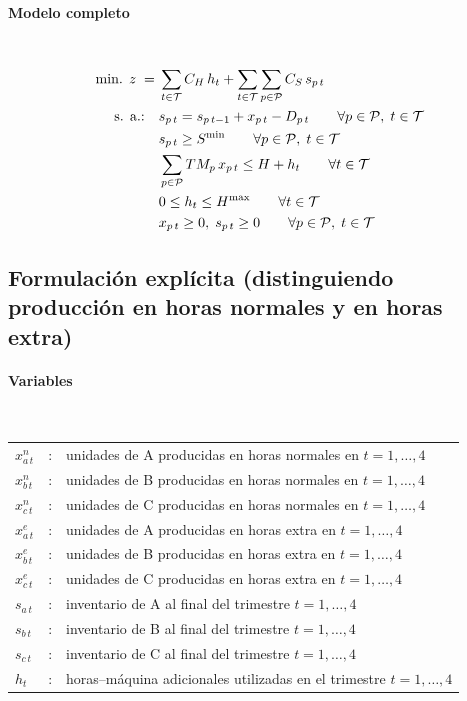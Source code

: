 \paragraph{Modelo completo}\mbox{}\\
\begin{align}
\mbox{min. } z \;=\;& \sum_{t \in \mathcal{T}} C_H\,h_t + \sum_{t \in \mathcal{T}} \sum_{p \in \mathcal{P}} C_S\,s_{p\,t} \notag\\
\mbox{s. a.:}\quad
& s_{p\,t} = s_{p\,t-1} + x_{p\,t} - D_{p\,t} \qquad \forall p \in \mathcal{P},\; t \in \mathcal{T} \notag\\
& s_{p\,t} \ge S^{\min} \qquad \forall p \in \mathcal{P},\; t \in \mathcal{T} \notag\\
& \sum_{p \in \mathcal{P}} TM_p\,x_{p\,t} \le H + h_t \qquad \forall t \in \mathcal{T} \notag\\
& 0 \le h_t \le H^{\max} \qquad \forall t \in \mathcal{T} \notag\\
& x_{p\,t} \ge 0,\; s_{p\,t} \ge 0 \qquad \forall p \in \mathcal{P},\; t \in \mathcal{T} \notag
\end{align}


\subsection{Formulación explícita (distinguiendo producción en horas normales y en horas extra)}

\paragraph{Variables}\mbox{}\\
\begin{tabular}{l c l}
    $x^{n}_{a\,t}$ & : & unidades de A producidas en horas normales en $t=1,\dots,4$\\
    $x^{n}_{b\,t}$ & : & unidades de B producidas en horas normales en $t=1,\dots,4$\\
    $x^{n}_{c\,t}$ & : & unidades de C producidas en horas normales en $t=1,\dots,4$\\
    $x^{e}_{a\,t}$ & : & unidades de A producidas en horas extra en $t=1,\dots,4$\\
    $x^{e}_{b\,t}$ & : & unidades de B producidas en horas extra en $t=1,\dots,4$\\
    $x^{e}_{c\,t}$ & : & unidades de C producidas en horas extra en $t=1,\dots,4$\\
    $s_{a\,t}$     & : & inventario de A al final del trimestre $t=1,\dots,4$\\
    $s_{b\,t}$     & : & inventario de B al final del trimestre $t=1,\dots,4$\\
    $s_{c\,t}$     & : & inventario de C al final del trimestre $t=1,\dots,4$\\
    $h_t$          & : & horas--máquina adicionales utilizadas en el trimestre $t=1,\dots,4$\\
\end{tabular}


